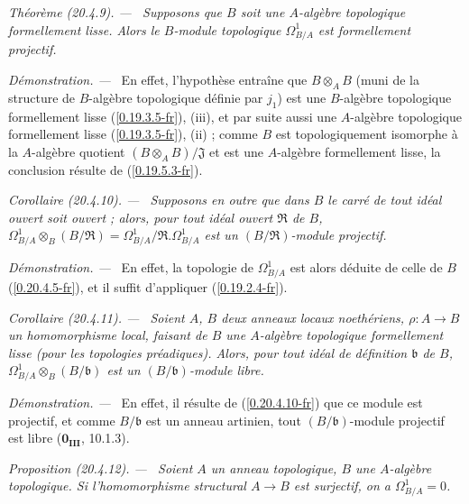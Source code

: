 \documentclass[10pt,oneside]{book}
\makeatletter
\newcommand{\sref}[1]{(\ref{#1})}
\newcommand{\setmanualcurrentlabel}[1]{\def\@currentlabel{#1}}
\newcommand{\oldpage}[2][]{%
  \setcounter{footnote}{0}%
  \marginpar{\scriptsize\textbf{#1}~|~#2}\ignorespaces}
\newenvironment{proposition}[1][]{%
  \setmanualcurrentlabel{#1}\par\medskip\noindent\itshape Proposition (#1). ---\ }{\par}
\newenvironment{theorem}[1][]{%
  \setmanualcurrentlabel{#1}\par\medskip\noindent\itshape Théorème (#1). ---\ }{\par}
\newenvironment{corollary}[1][]{%
  \setmanualcurrentlabel{#1}\par\medskip\noindent\itshape Corollaire (#1). ---\ }{\par}
\newenvironment{proof}{%
  \par\medskip\noindent\textit{Démonstration. ---\ }}{\par}
\makeatother
\begin{document}
\begin{theorem}[20.4.9]
\label{0.20.4.9-fr}
Supposons que $B$ soit une $A$-algèbre topologique formellement lisse. Alors
le $B$-module topologique $\Omega^1_{B/A}$ est \emph{formellement projectif}.
\end{theorem}

\begin{proof}
En effet, l'hypothèse entraîne que $B\otimes_A B$ (muni de la structure de
$B$-algèbre topologique définie par $j_1$) est une $B$-algèbre topologique
formellement lisse \sref{0.19.3.5-fr}, (iii), et par suite aussi une
$A$-algèbre topologique formellement lisse \sref{0.19.3.5-fr}, (ii) ; comme
$B$ est topologiquement isomorphe à la $A$-algèbre quotient
$(B\otimes_A B)/\mathfrak{J}$ et est une $A$-algèbre formellement lisse, la
conclusion résulte de \sref{0.19.5.3-fr}.
\end{proof}

\oldpage[0\textsubscript{IV-1}]{127}
\begin{corollary}[20.4.10]
\label{0.20.4.10-fr}
Supposons en outre que dans $B$ le carré de tout idéal ouvert soit ouvert ;
alors, pour tout idéal ouvert $\mathfrak{R}$ de $B$,
$\Omega^1_{B/A}\otimes_B(B/\mathfrak{R})
=\Omega^1_{B/A}/\mathfrak{R}.\Omega^1_{B/A}$ est un
$(B/\mathfrak{R})$-module projectif.
\end{corollary}

\begin{proof}
En effet, la topologie de $\Omega^1_{B/A}$ est alors déduite de celle de
$B$ \sref{0.20.4.5-fr}, et il suffit d'appliquer \sref{0.19.2.4-fr}.
\end{proof}

\begin{corollary}[20.4.11]
\label{0.20.4.11-fr}
Soient $A$, $B$ deux anneaux locaux noethériens, $\rho:A\to B$ un
homomorphisme local, faisant de $B$ une $A$-algèbre topologique formellement
lisse (pour les topologies préadiques). Alors, pour tout idéal de définition
$\mathfrak{b}$ de $B$,
$\Omega^1_{B/A}\otimes_B(B/\mathfrak{b})$ est un
$(B/\mathfrak{b})$-module libre.
\end{corollary}

\begin{proof}
En effet, il résulte de \sref{0.20.4.10-fr} que ce module est projectif, et
comme $B/\mathfrak{b}$ est un anneau artinien, tout
$(B/\mathfrak{b})$-module projectif est libre
($\mathbf{0_{III}}$, 10.1.3).
\end{proof}

\begin{proposition}[20.4.12]
\label{0.20.4.12-fr}
Soient $A$ un anneau topologique, $B$ une $A$-algèbre topologique. Si
l'homomorphisme structural $A\to B$ est surjectif, on a
$\Omega^1_{B/A}=0$.
\end{proposition}
\end{document}

